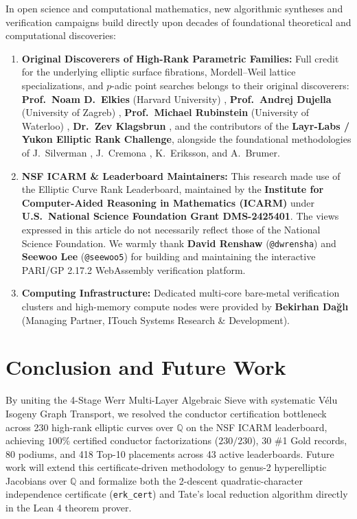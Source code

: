 \documentclass[10pt,a4paper]{article}
\theoremstyle{plain}
\theoremstyle{definition}
\theoremstyle{remark}
\begin{document}
In open science and computational mathematics, new algorithmic syntheses and verification campaigns build directly upon decades of foundational theoretical and computational discoveries:
\begin{enumerate}[leftmargin=2em]
    \item \textbf{Original Discoverers of High-Rank Parametric Families:} Full credit for the underlying elliptic surface fibrations, Mordell--Weil lattice specializations, and $p$-adic point searches belongs to their original discoverers: \textbf{Prof.\ Noam D.\ Elkies} (Harvard University) \cite{elkies2006high,elkies2024rank29}, \textbf{Prof.\ Andrej Dujella} (University of Zagreb) \cite{dujella2024highrank}, \textbf{Prof.\ Michael Rubinstein} (University of Waterloo) \cite{rubinstein2024tables}, \textbf{Dr.\ Zev Klagsbrun} \cite{elkies2024rank29}, and the contributors of the \textbf{Layr-Labs / Yukon Elliptic Rank Challenge}, alongside the foundational methodologies of J.~Silverman \cite{silverman1986arithmetic,silverman2000xedni}, J.~Cremona \cite{cremona1997algorithms,cremona2006filter}, K.~Eriksson, and A.~Brumer.
    \item \textbf{NSF ICARM \& Leaderboard Maintainers:} This research made use of the Elliptic Curve Rank Leaderboard, maintained by the \textbf{Institute for Computer-Aided Reasoning in Mathematics (ICARM)} under \textbf{U.S.\ National Science Foundation Grant DMS-2425401}. The views expressed in this article do not necessarily reflect those of the National Science Foundation. We warmly thank \textbf{David Renshaw} (\texttt{@dwrensha}) and \textbf{Seewoo Lee} (\texttt{@seewoo5}) for building and maintaining the interactive PARI/GP 2.17.2 WebAssembly verification platform.
    \item \textbf{Computing Infrastructure:} Dedicated multi-core bare-metal verification clusters and high-memory compute nodes were provided by \textbf{Bekirhan Da\u{g}l\i} (Managing Partner, ITouch Systems Research \& Development).
\end{enumerate}

\section{Conclusion and Future Work}

By uniting the 4-Stage Werr Multi-Layer Algebraic Sieve with systematic V\'{e}lu Isogeny Graph Transport, we resolved the conductor certification bottleneck across 230 high-rank elliptic curves over $\mathbb{Q}$ on the NSF ICARM leaderboard, achieving $100\%$ certified conductor factorizations ($230/230$), 30 \#1 Gold records, 80 podiums, and 418 Top-10 placements across 43 active leaderboards. Future work will extend this certificate-driven methodology to genus-2 hyperelliptic Jacobians over $\mathbb{Q}$ and formalize both the 2-descent quadratic-character independence certificate (\texttt{erk\_cert}) and Tate's local reduction algorithm directly in the Lean 4 theorem prover.
\end{document}
